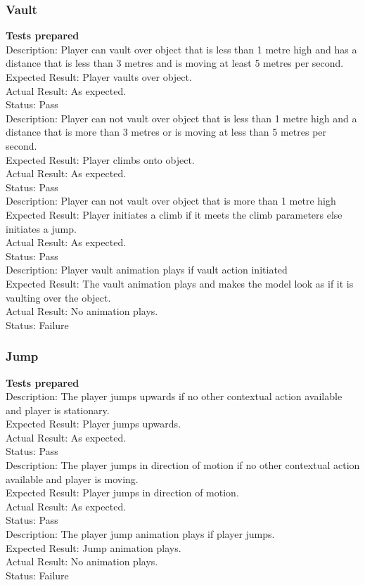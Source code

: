 \documentclass[11pt,a4paper]{article}
\begin{document}
\subsubsection{Vault}
\textbf{Tests prepared}\\
Description: Player can vault over object that is less than 1 metre high and has a distance that is less than 3 metres and is moving at least 5 metres per second. \\
Expected Result: Player vaults over object.\\
Actual Result:  As expected.\\
Status: Pass
\smallskip\\
Description: Player can not vault over object that is less than 1 metre high and a distance that is more than 3 metres or is moving at less than 5 metres per second. \\
Expected Result: Player climbs onto object.\\
Actual Result:  As expected.\\
Status: Pass
\smallskip\\
Description: Player can not vault over object that is more than 1 metre high\\
Expected Result: Player initiates a climb if it meets the climb parameters else initiates a jump.\\
Actual Result: As expected.\\
Status: Pass
\smallskip\\
Description: Player vault animation plays if vault action initiated\\
Expected Result: The vault animation plays and makes the model look as if it is vaulting over the object.\\
Actual Result:  No animation plays.\\
Status: Failure
\subsubsection{Jump}
\textbf{Tests prepared}\\
Description: The player jumps upwards if no other contextual action available and player is stationary. \\
Expected Result: Player jumps upwards.\\
Actual Result:  As expected.\\
Status: Pass
\smallskip\\
Description: The player jumps in direction of motion if no other contextual action available and player is moving. \\
Expected Result: Player jumps in direction of motion.\\
Actual Result: As expected.\\
Status: Pass
\smallskip\\
Description: The player jump animation plays if player jumps. \\
Expected Result: Jump animation plays.\\
Actual Result:  No animation plays.\\
Status: Failure
\end{document}
